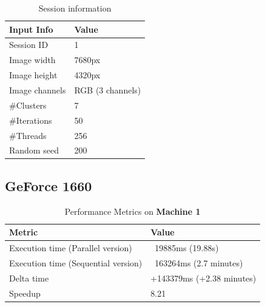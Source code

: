     \begin{table}[H]
        \centering
        \begin{tabular}{|l|l|}
        \hline
        \textbf{Input Info}                    & \textbf{Value}                       \\ \hline
        Session ID                             & 1                                     \\ \hline
        Image width                            & 7680px                                \\ \hline
        Image height                           & 4320px                                \\ \hline
        Image channels                         & RGB (3 channels)                      \\ \hline
        \#Clusters                             & 7                                     \\ \hline
        \#Iterations                           & 50                                    \\ \hline
        \#Threads                              & 256                                   \\ \hline
        Random seed                            & 200                                   \\ \hline
        \end{tabular}
        \caption{Session information}
        \label{tab:session_information_test2}
        \end{table}
        

        \subsection{GeForce 1660}

        \begin{table}[H]
            \centering
            \begin{tabular}{|l|l|}
            \hline
            \textbf{Metric}                         & \textbf{Value}                       \\ \hline
            Execution time (Parallel version)       & ~19885ms (19.88s)                     \\ \hline
            Execution time (Sequential version)     & ~163264ms (2.7 minutes)               \\ \hline
            Delta time                               & +143379ms (+2.38 minutes)             \\ \hline
            Speedup                                  & 8.21                                   \\ \hline
            \end{tabular}
            \caption{Performance Metrics on \textbf{Machine 1}}
            \label{table:performance_metrics_test2_machine1}
        \end{table}
        
